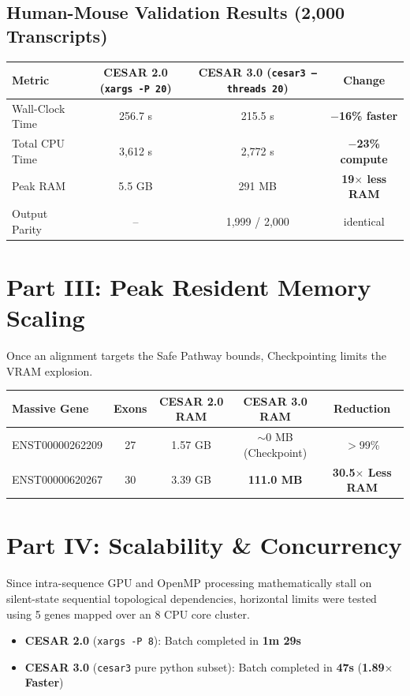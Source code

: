 \documentclass[11pt,a4paper]{article}
\begin{document}
\subsection{Human-Mouse Validation Results (2,000 Transcripts)}
\begin{table}[h!]
\centering
\begin{tabular}{@{}lccc@{}}
\toprule
\textbf{Metric} & \textbf{CESAR 2.0 (\texttt{xargs -P 20})} & \textbf{CESAR 3.0 (\texttt{cesar3 --threads 20})} & \textbf{Change} \\ \midrule
Wall-Clock Time   & 256.7 s & 215.5 s & \textbf{$-$16\% faster} \\
Total CPU Time    & 3,612 s & 2,772 s & \textbf{$-$23\% compute} \\
Peak RAM          & 5.5 GB  & 291 MB & \textbf{19$\times$ less RAM} \\
Output Parity     & --      & 1,999 / 2,000 & identical \\ \bottomrule
\end{tabular}
\end{table}

\section{Part III: Peak Resident Memory Scaling}
Once an alignment targets the Safe Pathway bounds, Checkpointing limits the VRAM explosion.

\begin{table}[h!]
\centering
\begin{tabular}{@{}lcccc@{}}
\toprule
\textbf{Massive Gene} & \textbf{Exons} & \textbf{CESAR 2.0 RAM} & \textbf{CESAR 3.0 RAM} & \textbf{Reduction} \\ \midrule
ENST00000262209 & 27 & 1.57 GB & $\sim$0 MB (Checkpoint) & $>$99\% \\
ENST00000620267 & 30 & 3.39 GB & \textbf{111.0 MB} & \textbf{30.5$\times$ Less RAM} \\ \bottomrule
\end{tabular}
\end{table}

\section{Part IV: Scalability \& Concurrency}
Since intra-sequence GPU and OpenMP processing mathematically stall on silent-state sequential topological dependencies, horizontal limits were tested using 5 genes mapped over an 8 CPU core cluster.

\begin{itemize}
    \item \textbf{CESAR 2.0} (\texttt{xargs -P 8}): Batch completed in \textbf{1m 29s}
    \item \textbf{CESAR 3.0} (\texttt{cesar3} pure python subset): Batch completed in \textbf{47s} (\textbf{1.89$\times$ Faster})
\end{itemize}
\end{document}
